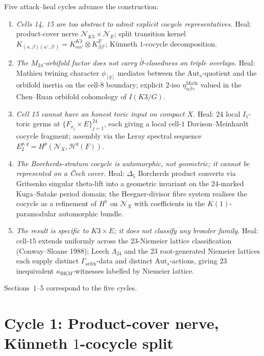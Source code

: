 \documentclass[11pt]{amsart}
\providecommand{\kBKM}{\kappa_{\mathrm{BKM}}}
\providecommand{\Aut}{\mathrm{Aut}}
\providecommand{\cN}{\mathcal{N}}
\providecommand{\cH}{\mathcal{H}}
\begin{document}
Five attack--heal cycles advance the construction:
\begin{enumerate}
\item[(A1)] \emph{Cells 14, 15 are too abstract to admit explicit
  cocycle representatives.} Heal: product-cover nerve
  $\cN_{K3} \times \cN_E$; split transition kernel
  $K_{(\alpha, \beta)(\alpha', \beta')} = K^{K3}_{\alpha \alpha'}
  \otimes K^{E}_{\beta \beta'}$; K\"{u}nneth
  $1$-cocycle decomposition.
\item[(A2)] \emph{The $M_{24}$-orbifold factor does not carry
  $\bar\partial$-closedness on triple overlaps.} Heal: Mathieu twining
  character $\phi_{[g]}$ mediates between the $\Aut_s$-quotient and
  the orbifold inertia on the cell-$8$ boundary; explicit 2-iso
  $\eta_{\alpha\beta\gamma}^{\mathrm{Math}}$ valued in the
  Chen--Ruan orbifold cohomology of $I(K3/G)$.
\item[(A3)] \emph{Cell 15 cannot have an honest toric input on compact
  $X$.} Heal: 24 local $I_1$-toric germs at $\{F_{x_j} \times E\}_{j=1}^{24}$,
  each giving a local cell-$1$ Davison--Meinhardt cocycle fragment;
  assembly via the Leray spectral sequence $E_2^{p,q} = H^p(\cN_X,
  \cH^q(\underline{F}))$.
\item[(A4)] \emph{The Borcherds-stratum cocycle is automorphic, not
  geometric; it cannot be represented on a \v{C}ech cover.} Heal:
  $\Delta_5$ Borcherds product converts via Gritsenko singular
  theta-lift into a geometric invariant on the $24$-marked Kuga--Satake
  period domain; the Heegner-divisor fibre system realises the cocycle
  as a refinement of $H^1$ on $\cN_X$ with coefficients in the
  $K(1)$-paramodular automorphic bundle.
\item[(A5)] \emph{The result is specific to $K3 \times E$; it does not
  classify any broader family.} Heal: cell-$15$ extends uniformly
  across the $23$-Niemeier lattice classification
  (Conway--Sloane 1988); Leech $\Lambda_{24}$ and the 23 root-generated
  Niemeier lattices each supply distinct $\Gamma_{\mathrm{arith}}$-data
  and distinct $\Aut_s$-actions, giving $23$ inequivalent
  $\kBKM$-witnesses labelled by Niemeier lattice.
\end{enumerate}

Sections~$1$--$5$ correspond to the five cycles.

\section{Cycle 1: Product-cover nerve, K\"{u}nneth $1$-cocycle split}
\end{document}
